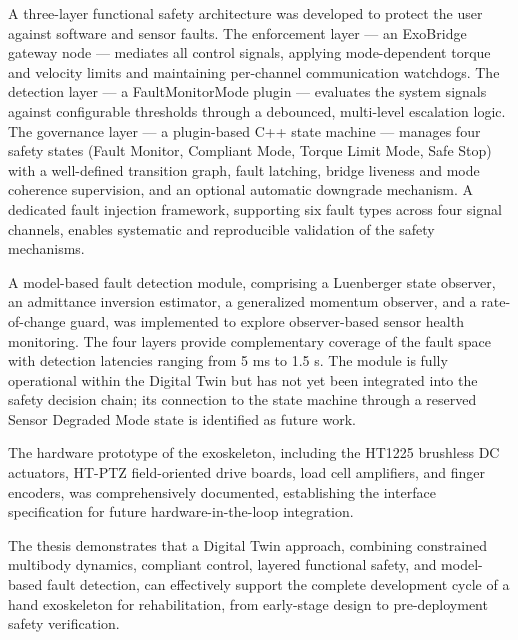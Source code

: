 A three-layer functional safety architecture was developed to protect the user against software and sensor faults. The enforcement layer — an ExoBridge gateway node — mediates all control signals, applying mode-dependent torque and velocity limits and maintaining per-channel communication watchdogs. The detection layer — a FaultMonitorMode plugin — evaluates the system signals against configurable thresholds through a debounced, multi-level escalation logic. The governance layer — a plugin-based C++ state machine — manages four safety states (Fault Monitor, Compliant Mode, Torque Limit Mode, Safe Stop) with a well-defined transition graph, fault latching, bridge liveness and mode coherence supervision, and an optional automatic downgrade mechanism. A dedicated fault injection framework, supporting six fault types across four signal channels, enables systematic and reproducible validation of the safety mechanisms.
 
A model-based fault detection module, comprising a Luenberger state observer, an admittance inversion estimator, a generalized momentum observer, and a rate-of-change guard, was implemented to explore observer-based sensor health monitoring. The four layers provide complementary coverage of the fault space with detection latencies ranging from 5 ms to 1.5 s. The module is fully operational within the Digital Twin but has not yet been integrated into the safety decision chain; its connection to the state machine through a reserved Sensor Degraded Mode state is identified as future work.
 
The hardware prototype of the exoskeleton, including the HT1225 brushless DC actuators, HT-PTZ field-oriented drive boards, load cell amplifiers, and finger encoders, was comprehensively documented, establishing the interface specification for future hardware-in-the-loop integration.
 
The thesis demonstrates that a Digital Twin approach, combining constrained multibody dynamics, compliant control, layered functional safety, and model-based fault detection, can effectively support the complete development cycle of a hand exoskeleton for rehabilitation, from early-stage design to pre-deployment safety verification.